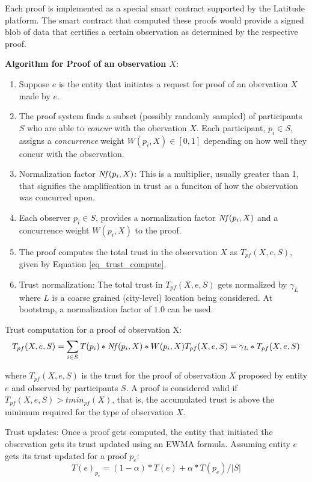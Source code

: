 Each proof is implemented as a special smart contract supported by the Latitude platform. The smart contract that
computed these proofs would provide a signed blob of data that certifies a certain observation as determined by the
respective proof.

\noindent
{\bf Algorithm for Proof of an observation $X$}:
\begin{enumerate}
    \item Suppose $e$ is the entity that initiates a request for proof of an obervation $X$ made by $e$.
    \item The proof system finds a subset (possibly randomly sampled) of participants $S$ who are able
        to {\it concur} with the obervation $X$. Each participant, $p_i \in S$, assigns a {\em concurrence} weight
        $W(p_i, X) \in [0,1]$ depending on how well they concur with the observation.
    \item Normalization factor $\mathit{Nf}(p_i, X)$: This is a multiplier, usually greater than 1, that signifies the
        amplification in trust as a funciton of how the observation was concurred upon. 
    \item Each observer $p_i \in S$, provides a normalization factor $\mathit{Nf}(p_i, X)$ and a concurrence weight $W(p_i, X)$
        to the proof.
    \item The proof computes the total trust in the observation $X$ as $T_{pf}(X, e, S)$, given by Equation
        \ref{eq_trust_compute}.
    \item Trust normalization: The total trust in $T_{pf}(X, e, S)$ gets normalized by $\gamma_L$ where $L$ is a coarse
        grained (city-level) location being considered. At bootstrap, a normalization factor of $1.0$ can be used.
\end{enumerate}

\noindent
Trust computation for a proof of observation X:
\begin{equation*}
    \label{eq_trust_compute}
    T_{pf}(X, e, S) = \sum_{i\in S} T(p_i) * \mathit{Nf}(p_i, X) * W(p_i, X)
    T_{pf}(X, e, S) = \gamma_L * T_{pf}(X, e, S)
\end{equation*}

where $T_{pf}(X, e, S)$ is the trust for the proof of observation $X$ proposed by entity $e$ and observed by
participants $S$. A proof is considered valid if $T_{pf}(X, e, S) > tmin_{pf}(X)$, that is, the accumulated trust is
above the minimum required for the type of observation $X$.

\noindent
Trust updates: Once a proof gets computed, the entity that initiated the observation gets its trust updated using an
EWMA formula. Assuming entity $e$ gets its trust updated for a proof $p_e$:
\begin{equation*}
    T(e)_{p_e} = (1 - \alpha) * T(e) + \alpha * T(p_e) / |S|
\end{equation*}


